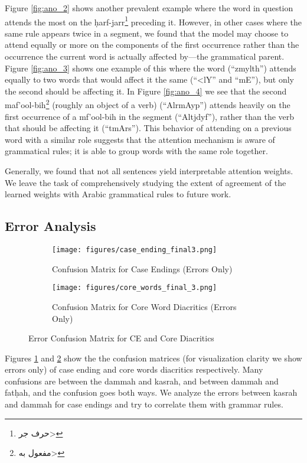 \documentclass[11pt]{article}
\begin{document}
Figure \ref{fig:ano_2} shows another prevalent example where the word in question attends the most on the \d{h}arf-jarr\footnote{\<حرف جر>} preceding it. However, in other cases where the same rule appears twice in a segment, we found that the model may choose to attend equally or more on the components of the first occurrence rather than the occurrence the current word is actually affected by---the grammatical parent. Figure \ref{fig:ano_3} shows one example of this where the word (``zmylth'') attends equally to two words that would affect it the same (``<lY'' and ``mE''), but only the second should be affecting it. In Figure \ref{fig:ano_4} we see that the second maf'ool-bih\footnote{\<مفعول به>} (roughly an object of a verb) (``AlrmAyp'') attends heavily on the first occurrence of a mf'ool-bih in the segment (``Altjdyf''), rather than the verb that should be affecting it (``tmArs''). This behavior of attending on a previous word with a similar role suggests that the attention mechanism is aware of grammatical rules; it is able to group words with the same role together.

Generally, we found that not all sentences yield interpretable attention weights. We leave the task of comprehensively studying the extent of agreement of the learned weights with Arabic grammatical rules to future work.

\subsection{Error Analysis}

\begin{figure}[h]
\centering
\begin{subfigure}{.5\textwidth}
  \centering
  \texttt{[image: figures/case\_ending\_final3.png]}
  \caption{Confusion Matrix for Case Endings (Errors Only)}
  \label{fig:conf_ce}
\end{subfigure}\begin{subfigure}{.5\textwidth}
  \centering
  \texttt{[image: figures/core\_words\_final\_3.png]}
  \caption{Confusion Matrix for Core Word Diacritics (Errors Only)}
  \label{fig:conf_core}
\end{subfigure}
\caption{Error Confusion Matrix for CE and Core Diacritics}
\label{fig:conf}
\end{figure}

Figures \ref{fig:conf_ce} and \ref{fig:conf_core} show the the confusion matrices (for visualization clarity we show errors only) of case ending and core words diacritics respectively. Many confusions are between the dammah and kasrah, and between dammah and fat\d{h}ah, and the confusion goes both ways. We analyze the errors between kasrah and dammah for case endings and try to correlate them with grammar rules. 
\end{document}
